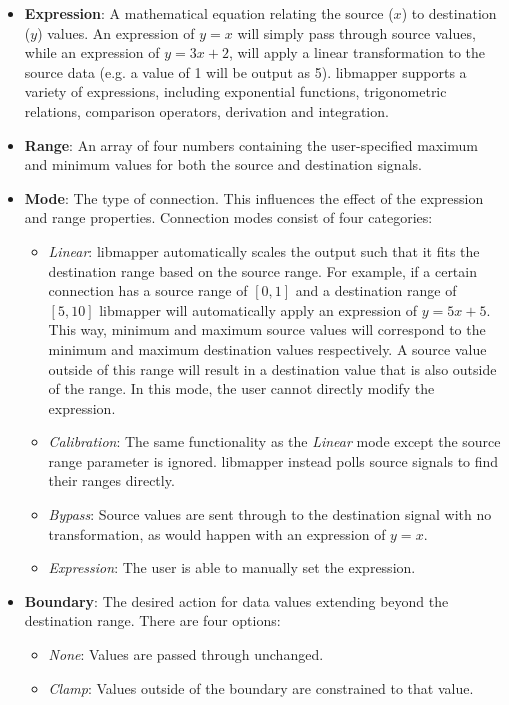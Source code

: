 \begin{itemize}
	\item\textbf{Expression}: A mathematical equation relating the source ($x$) to destination ($y$) values. An expression of $y = x$ will simply pass through source values, while an expression of $y = 3x + 2$, will apply a linear transformation to the source data (e.g. a value of 1 will be output as 5). libmapper supports a variety of expressions, including exponential functions, trigonometric relations, comparison operators, derivation and integration. 
	\item\textbf{Range}: An array of four numbers containing the user-specified maximum and minimum values for both the source and destination signals.
	\item\textbf{Mode}: The type of connection. This influences the effect of the expression and range properties. Connection modes consist of four categories:
	\begin{itemize}
		\item \emph{Linear}: libmapper automatically scales the output such that it fits the destination range based on the source range. For example, if a certain connection has a source range of $[0, 1]$ and a destination range of $[5, 10]$ libmapper will automatically apply an expression of $y = 5x + 5$. This way, minimum and maximum source values will correspond to the minimum and maximum destination values respectively. A source value outside of this range will result in a destination value that is also outside of the range. In this mode, the user cannot directly modify the expression. 
		\item \emph{Calibration}: The same functionality as the \emph{Linear} mode except the source range parameter is ignored. libmapper instead polls source signals to find their ranges directly.
		\item \emph{Bypass}: Source values are sent through to the destination signal with no transformation, as would happen with an expression of $y = x$.
		\item \emph{Expression}: The user is able to manually set the expression.
	\end{itemize}
	\item\textbf{Boundary}: The desired action for data values extending beyond the destination range. There are four options:
	\begin{itemize}
		\item\emph{None}: Values are passed through unchanged.
		\item\emph{Clamp}: Values outside of the boundary are constrained to that value.

\end{itemize}
\end{itemize}
